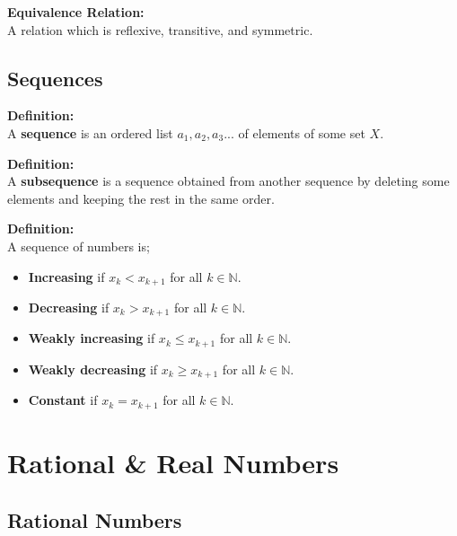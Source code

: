 \documentclass{report}
\newenvironment{frameblue}[1][BlueViolet]
  {\begin{tcolorbox}[colframe=#1,colback=white]}
  {\end{tcolorbox}}
\begin{document}
\textbf{Equivalence Relation:}\\
A relation which is reflexive, transitive, and symmetric.

\section{Sequences}

\begin{frameblue}
    \textbf{Definition:}\\
    A \textbf{sequence} is an ordered list $a_1,a_2,a_3...$ of elements of some set $X$.
\end{frameblue}

\begin{frameblue}
    \textbf{Definition:}\\
    A \textbf{subsequence} is a sequence obtained from another sequence by deleting some elements and keeping the rest in the same order.
\end{frameblue}

\begin{frameblue}
    \textbf{Definition:}\\
    A sequence of numbers is;
    \begin{itemize}
        \item \textbf{Increasing} if $x_k < x_{k+1}$ for all $k \in \mathbb{N}$.
        \item \textbf{Decreasing} if $x_k > x_{k+1}$ for all $k \in \mathbb{N}$.
        \item \textbf{Weakly increasing} if $x_k \leq x_{k+1}$ for all $k \in \mathbb{N}$.
        \item \textbf{Weakly decreasing} if $x_k \geq x_{k+1}$ for all $k \in \mathbb{N}$.
        \item \textbf{Constant} if $x_k = x_{k+1}$ for all $k \in \mathbb{N}$.
    \end{itemize}
\end{frameblue}

\chapter{Rational \& Real Numbers}
\section{Rational Numbers}
\end{document}
